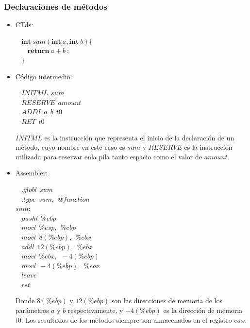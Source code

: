\documentclass[11pt,a4paper]{article}
\begin{document}
\subsubsection{Declaraciones de métodos}
\begin{itemize}
	\item CTds:
		\begin{flushleft}
			$\ \ \ \ \textbf{int} \ sum(\textbf{int} \ a,\textbf{int} \ b) \{$ \\
			$\ \ \ \ \ \ \ \ \textbf{return} \ a + 	b \ ;$ \\
			$\ \ \ \ \}$
		\end{flushleft}
	\item Código intermedio:
		\begin{flushleft}
			$\ \ \ \ INITML \ \ sum$ \\
			$\ \ \ \ RESERVE \ \ amount$ \\
			$\ \ \ \ ADDI \ \ a \ \ b \ \ t0$ \\
			$\ \ \ \ RET \ \ t0$
		\end{flushleft}
		$INITML$ es la instrucción que representa el inicio de la declaración de un método, cuyo nombre en este caso es $sum$ y $RESERVE$ es la instrucción utilizada para reservar enla pila tanto espacio como el valor de $amount$.
	\item Assembler:
		\begin{flushleft}
			$\ \ \ \ .globl \ \ sum$ \\
			$\ \ \ \ .type \ \ sum, \ \ @function $ \\
			$sum:$ \\
			$\ \ \ \ pushl \ \ \%ebp$ \\
			$\ \ \ \ movl \ \ \%esp, \ \ \%ebp$ \\
			$\ \ \ \ movl \ \ 8(\%ebp), \ \ \%ebx$ \\
			$\ \ \ \ addl \ \ 12(\%ebp), \ \ \%ebx$ \\
			$\ \ \ \ movl \ \ \%ebx, \ \ -4(\%ebp)$ \\
			$\ \ \ \ movl \ \ -4(\%ebp), \ \ \%eax$ \\
			$\ \ \ \ leave$ \\
			$\ \ \ \ ret$	
		\end{flushleft}
		Donde $8(\%ebp)$ y $12(\%ebp)$ son las direcciones de memoria de los parámetros $a$ y $b$ respectivamente, y $-4(\%ebp)$ es la dirección de memoria $t0$. Los resultados de los métodos siempre son almacenados en el registro $eax$. 
\end{itemize}
\end{document}
